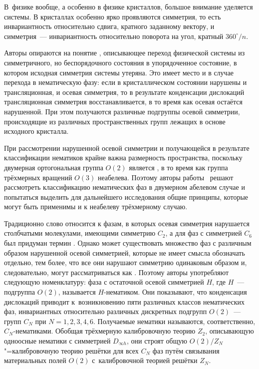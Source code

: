 \documentclass[a4paper, 14pt, titlepage]{extarticle}
\begin{document}
  В~физике вообще, а особенно в физике кристаллов, большое внимание уделяется 
  системы. В кристаллах особенно ярко проявляются  симметрия, то есть
  инвариантность относительно сдвига, кратного заданному вектору, и  симметрия~---
  инвариантность относительно поворота на угол, кратный $360^\circ/n$.

  Авторы опираются на понятие , описывающее переход физической
  системы из симметричного, но беспорядочного состояния в упорядоченное состояние, в котором
  исходная симметрия системы утеряна. Это имеет место и в случае перехода в нематическую фазу: если
  в кристаллическом состоянии нарушены и трансляционная, и осевая симметрия, то в результате
  конденсации дислокаций трансляционная симметрия восстанавливается, в то время как осевая остаётся
  нарушенной. При этом получаются различные подгруппы осевой симметрии, происходящие из различных
  пространственных групп лежащих в основе исходного кристалла.

  При рассмотрении нарушенной осевой симметрии и получающейся в результате классификации нематиков
  крайне важна размерность пространства, поскольку двумерная ортогональная группа $O(2)$ является
  , в то время как группа трёхмерных вращений $O(3)$ неабелева. Поэтому авторы
  работы~\cite{liu-nematic} решают рассмотреть классификацию нематических фаз в двумерном абелевом
  случае и попытаться выделить для дальнейшего исследования общие принципы, которые могут быть
  применимы и к неабелеву трёхмерному случаю.

  Традиционно слово  относится к фазам, в которых осевая симметрия нарушается
  столбчатыми молекулами, имеющими симметрию $C_2$, а для фаз с симметрией $C_6$ был придуман термин
  . Однако может существовать множество фаз с различным образом нарушенной осевой
  симметрией, которые не имеет смысла обозначать отдельно, тем более, что все они нарушают симметрию
  одинаковым образом и, следовательно, могут рассматриваться как . Поэтому авторы
  употребляют следующую номенклатуру: фаза с остаточной осевой симметрией $H$, где $H$~--- подгруппа
  $O(2)$, называется $H$-нематиком. Они показывают, что конденсация дислокаций приводит
  к~возникновению пяти различных классов нематических фаз, инвариантных относительно различных
  дискретных подгрупп $O(2)$~--- групп $C_N$ при $N = 1,2,3,4,6$. Получаемые нематики называются,
  соответственно, $C_N$-нематиками.  Обобщая трёхмерную калибровочную теорию $Z_2$, описывающую
  одноосные нематики с симметрией $D_{\infty h}$, они строят общую $O(2)/Z_N$"=калибровочную теорию
  решётки для всех $C_N$ фаз путём связывания материальных полей $O(2)$ с~калибровочной теорией
  решётки $Z_N$.
\end{document}
